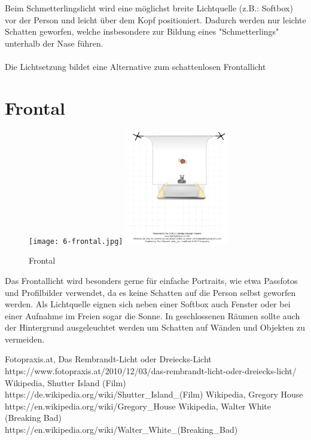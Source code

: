 \documentclass{school}
\begin{document}
Beim Schmetterlingslicht wird eine möglichst breite Lichtquelle (z.B.: Softbox) vor der Person und leicht über dem Kopf positioniert. Dadurch werden nur leichte Schatten geworfen, welche insbesondere zur Bildung eines "Schmetterlings" unterhalb der Nase führen.
\\\\
Die Lichtsetzung bildet eine Alternative zum schattenlosen Frontallicht

\newpage
\section{Frontal}
\begin{figure}[h]
	\centering
	\texttt{[image: 6-frontal.jpg]}
	\includegraphics[height=5cm]{6-frontal-diagram.png}
	\caption{Frontal}
\end{figure}

Das Frontallicht wird besonders gerne für einfache Portraits, wie etwa Passfotos und Profilbilder verwendet, da es keine Schatten auf die Person selbst geworfen werden. Als Lichtquelle eignen sich neben einer Softbox auch Fenster oder bei einer Aufnahme im Freien sogar die Sonne. In geschlossenen Räumen sollte auch der Hintergrund ausgeleuchtet werden um Schatten auf Wänden und Objekten zu vermeiden.

\vfill{}

\listoffigures

\begin{thebibliography}{9}
 Fotopraxis.at, Das Rembrandt-Licht oder Dreiecks-Licht \\ https://www.fotopraxis.at/2010/12/03/das-rembrandt-licht-oder-dreiecks-licht/
 Wikipedia, Shutter Island (Film) \\ https://de.wikipedia.org/wiki/Shutter\_Island\_(Film)
 Wikipedia, Gregory House \\ https://en.wikipedia.org/wiki/Gregory\_House
 Wikipedia, Walter White (Breaking Bad) \\ https://en.wikipedia.org/wiki/Walter\_White\_(Breaking\_Bad)
\end{thebibliography}
\end{document}
